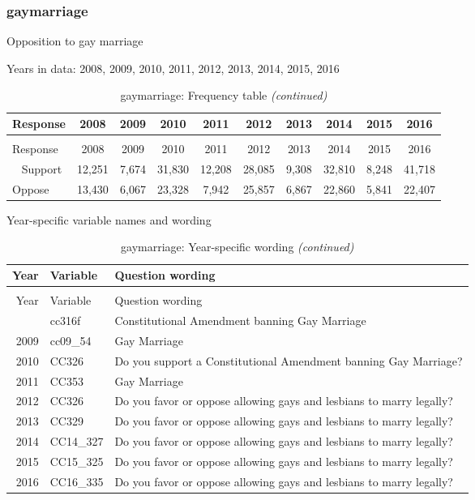 \documentclass[12pt]{article}
\begin{document}
\subsubsection{gaymarriage}\label{gaymarriage}

Opposition to gay marriage

Years in data: 2008, 2009, 2010, 2011, 2012, 2013, 2014, 2015,
2016\begingroup\fontsize{10}{12}\selectfont

\begin{longtable}[t]{lccccccccc}
\caption{\label{tab:unnamed-chunk-4}gaymarriage: Frequency table}\\
\toprule
Response & 2008 & 2009 & 2010 & 2011 & 2012 & 2013 & 2014 & 2015 & 2016\\
\midrule
\endfirsthead
\caption[]{gaymarriage: Frequency table \textit{(continued)}}\\
\toprule
Response & 2008 & 2009 & 2010 & 2011 & 2012 & 2013 & 2014 & 2015 & 2016\\
\midrule
\endhead
\
\endfoot
\bottomrule
\endlastfoot
Support & 12,251 & 7,674 & 31,830 & 12,208 & 28,085 & 9,308 & 32,810 & 8,248 & 41,718\\
Oppose & 13,430 & 6,067 & 23,328 & 7,942 & 25,857 & 6,867 & 22,860 & 5,841 & 22,407\\*
\end{longtable}

\endgroup{}

Year-specific variable names and wording

\begin{longtable}[t]{rl>{\raggedright\arraybackslash}p{10cm}}
\caption{\label{tab:unnamed-chunk-4}gaymarriage: Year-specific wording}\\
\toprule
Year & Variable & Question wording\\
\midrule
\endfirsthead
\caption[]{gaymarriage: Year-specific wording \textit{(continued)}}\\
\toprule
Year & Variable & Question wording\\
\midrule
\endhead
\
\endfoot
\bottomrule
\endlastfoot
2008 & cc316f & Constitutional Amendment banning Gay Marriage\\
2009 & cc09\_54 & Gay Marriage\\
2010 & CC326 & Do you support a Constitutional Amendment banning Gay Marriage?\\
2011 & CC353 & Gay Marriage\\
2012 & CC326 & Do you favor or oppose allowing gays and lesbians to marry legally?\\
2013 & CC329 & Do you favor or oppose allowing gays and lesbians to marry legally?\\
2014 & CC14\_327 & Do you favor or oppose allowing gays and lesbians to marry legally?\\
2015 & CC15\_325 & Do you favor or oppose allowing gays and lesbians to marry legally?\\
2016 & CC16\_335 & Do you favor or oppose allowing gays and lesbians to marry legally?\\*
\end{longtable}
\end{document}
